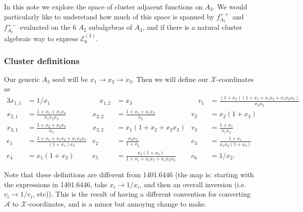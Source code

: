 \documentclass[12pt]{article}
\def\x{\mathcal{X}}
\def\a{\mathcal{A}}
\begin{document}
\thispagestyle{fancyplain}
 
\fancyhf{}
 
\cfoot{\fancyplain{}{\thepage}}


In this note we explore the space of cluster adjacent functions on $A_3$. We would particularly like to understand how much of this space is spanned by $f_{A_2}^{++}$ and $f_{A_2}^{+-}$ evaluated on the 6 $A_2$ subalgebras of $A_3$, and if there is a natural cluster algebraic way to express $\mathcal{E}^{(2)}_6$. 

\subsubsection*{Cluster definitions}

Our generic $A_3$ seed will be $x_1\to x_2\to x_3$. Then we will define our $\x$-coordinates as
\begin{alignat}{3}\label{def:A3coords}
	x_{1,1} &= 1/x_1  &\quad 
	x_{1,2} &= x_3 &\quad 
	v_1 &=\frac{(1+x_2) (1+x_1+x_1 x_2+x_1 x_2 x_3)}{x_2 x_3} \nonumber \\ 
	x_{2,1} &= \frac{1+x_1+x_1 x_2}{x_1 x_2 x_3} & 
	x_{2,2} &= \frac{1+x_1+x_1 x_2}{x_2} & 
	v_2 &= x_2 (1+x_3) \nonumber\\
	x_{3,1} &= \frac{1+x_2+x_2 x_3}{x_3} & 
	x_{3,2} &= x_1 (1+x_2+x_2 x_3) & 
	v_3 &= \frac{1+x_1}{x_1 x_2} \\
	e_1 &= \frac{1+x_1+x_1 x_2+x_1 x_2 x_3}{(1+x_1) x_3} & 
	e_2 &= \frac{x_2 x_3}{1+x_2} & 
	e_3 &= \frac{1+x_1}{x_1 x_2 (1+x_3)}\nonumber\\
	e_4 &= x_1 (1+x_2) & 
	e_5 &= \frac{x_2 (1+x_3)}{1+x_1+x_1 x_2+x_1 x_2 x_3} & 
	e_6 &= 1/x_2.\nonumber
\end{alignat}

Note that these definitions are different from 1401.6446 (the map is: starting with the expressions in 1401.6446, take $x_i\to 1/x_i$, and then an overall inversion (i.e. $v_i\to1/v_i$, etc)). This is the result of having a different convention for converting $\a$ to $\x$-coordinates, and is a minor but annoying change to make.\\
\end{document}
